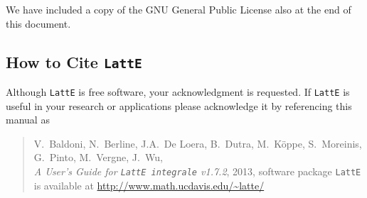 \documentclass{article}
\newcommand{\latte}{{\tt LattE}\xspace}
\newcommand{\latteV}{v1.7.2}
\begin{document}
We have included a copy of the GNU General Public License also at the
end of this document.

\subsection{How to Cite {\tt LattE}}

Although {\tt LattE} is free software, your acknowledgment
is requested.  If {\tt LattE} is useful in your research or
applications please acknowledge it by referencing this manual as

\begin{quote}
  V.~Baldoni, N.~Berline, J.A.~De Loera, B.~Dutra, M.~K\"oppe, S.~Moreinis,
  G.~Pinto, M.~Vergne, J.~Wu,
  \\
  {\em A User's Guide for {\tt LattE integrale} \latteV}, 2013, software
  package \latte is available at \url{http://www.math.ucdavis.edu/~latte/}
\end{quote}
\end{document}
